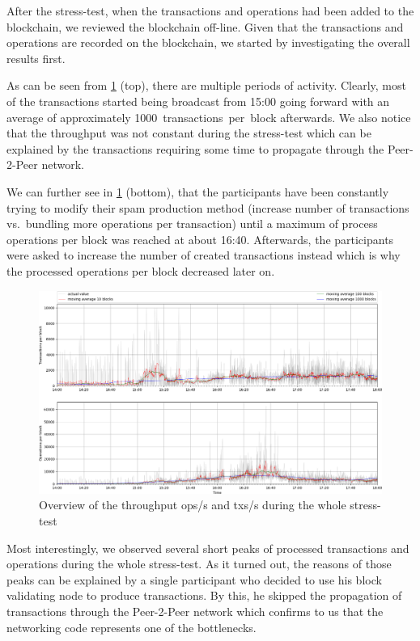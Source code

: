 After the stress-test, when the transactions and operations had been added to
the blockchain, we reviewed the blockchain off-line. Given
that the transactions and operations are recorded on the blockchain, we
started by investigating the overall results first.

As can be seen from \cref{fig:tpsall} (top), there are multiple periods of
activity. Clearly, most of the transactions started being
broadcast from 15:00 going forward with an average of approximately
\SI{1000}{transactions per block} afterwards. We also notice that the
throughput was not constant during the stress-test which can be explained by the
transactions requiring some time to propagate through the Peer-2-Peer network.

We can further see in \cref{fig:tpsall} (bottom), that the participants have
been constantly trying to modify their spam production method (increase number
of transactions vs.\ bundling more operations per transaction) until a maximum
of process operations per block was reached at about 16:40. Afterwards, the
participants were asked to increase the number of created transactions
instead which is why the processed operations per block decreased later on.

\begin{figure}[!htp]
 \centering
 \includegraphics[width=\linewidth]{figures/stress-test-overview.png}
 \caption{Overview of the throughput ops/s and txs/s during the whole stress-test}
 \label{fig:tpsall}
\end{figure}

Most interestingly, we observed several short peaks of processed transactions and
operations during the whole stress-test. As it turned out, the reasons of those
peaks can be explained by a single participant who decided to use his
block validating node to produce transactions. By this, he skipped the
propagation of transactions through the Peer-2-Peer network which confirms to
us that the networking code represents one of the bottlenecks.


